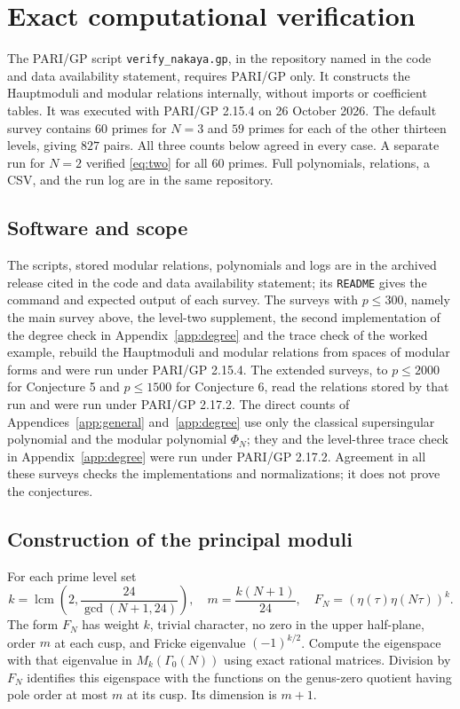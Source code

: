 \documentclass[11pt,a4paper]{article}
\theoremstyle{remark}\newtheorem{remark}[theorem]{Remark}
\numberwithin{equation}{section}
\begin{document}
	\section{Exact computational verification}\label{app:computation}
	The PARI/GP script \texttt{verify\_nakaya.gp}, in the repository named in the code and data availability statement, requires PARI/GP only. It constructs the Hauptmoduli and modular relations internally, without imports or coefficient tables. It was executed with PARI/GP 2.15.4 on 26 October 2026. The default survey contains $60$ primes for $N=3$ and $59$ primes for each of the other thirteen levels, giving $827$ pairs. All three counts below agreed in every case. A separate run for $N=2$ verified \eqref{eq:two} for all $60$ primes. Full polynomials, relations, a CSV, and the run log are in the same repository.
	
	\subsection{Software and scope}\label{app:overview}
	The scripts, stored modular relations, polynomials and logs are in the archived release cited in the code and data availability statement; its \texttt{README} gives the command and expected output of each survey. The surveys with $p\leq300$, namely the main survey above, the level-two supplement, the second implementation of the degree check in Appendix~\ref{app:degree} and the trace check of the worked example, rebuild the Hauptmoduli and modular relations from spaces of modular forms and were run under PARI/GP 2.15.4. The extended surveys, to $p\leq2000$ for Conjecture 5 and $p\leq1500$ for Conjecture 6, read the relations stored by that run and were run under PARI/GP 2.17.2. The direct counts of Appendices~\ref{app:general} and~\ref{app:degree} use only the classical supersingular polynomial and the modular polynomial $\Phi_N$; they and the level-three trace check in Appendix~\ref{app:degree} were run under PARI/GP 2.17.2. Agreement in all these surveys checks the implementations and normalizations; it does not prove the conjectures.
	
	\subsection{Construction of the principal moduli}
	For each prime level set
	\[
	k=\operatorname{lcm}\left(2,\frac{24}{\gcd(N+1,24)}\right),\quad
	m=\frac{k(N+1)}{24},\quad F_N=(\eta(\tau)\eta(N\tau))^k.
	\]
	The form $F_N$ has weight $k$, trivial character, no zero in the upper half-plane, order $m$ at each cusp, and Fricke eigenvalue $(-1)^{k/2}$. Compute the eigenspace with that eigenvalue in $M_k(\Gamma_0(N))$ using exact rational matrices. Division by $F_N$ identifies this eigenspace with the functions on the genus-zero quotient having pole order at most $m$ at its cusp. Its dimension is $m+1$.
	
\end{document}
